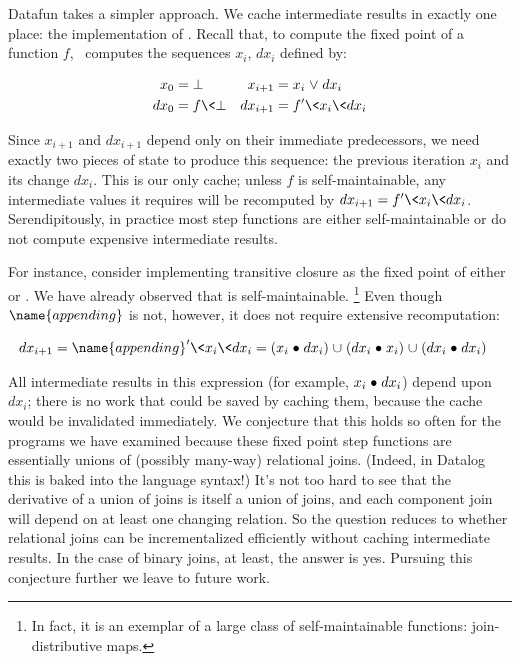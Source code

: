 Datafun takes a simpler approach.
%
We cache intermediate results in exactly one place: the implementation of \semifix.
%
Recall that, to compute the fixed point of a function $f$, \semifix\ computes the sequences $x_i$, $dx_i$ defined by:

\begin{align*}
  x_0 &= \bot &
  x_{i + 1} &= x_i \vee dx_i\\
  dx_0 &= f \<\bot &
  dx_{i + 1} &= f' \<x_i \<dx_i
\end{align*}

\noindent
Since $x_{i + 1}$ and $dx_{i + 1}$ depend only on their immediate predecessors, we
need exactly two pieces of state to produce this sequence: the previous iteration $x_i$ and its change $dx_i$.
%
This is our only cache; unless $f$ is self-maintainable, any intermediate values it requires will be recomputed by $dx_{i + 1} = f' \<x_i \<dx_i$.
%
Serendipitously, in practice most step functions  are either self-maintainable or do not compute expensive intermediate results.

For instance, consider implementing transitive closure as the fixed point of either  or .
%
We have already observed that  is self-maintainable.%
%
\footnote{In fact, it is an exemplar of a large class of self-maintainable functions: join-distributive maps. 
%
}
%
Even though $\name{appending}$ is not, however, it does not require extensive recomputation:

\begin{align*}
  dx_{i + 1} &= \name{appending}' \<x_i \<dx_i
  = (x_i \relcomp dx_i) \cup (dx_i \relcomp x_i) \cup (dx_i \relcomp dx_i)
\end{align*}

\noindent
All intermediate results in this expression (for example, $x_i \mathrel{\bullet} dx_i$) depend upon $dx_i$; there is no work that could be saved by caching them, because the cache would be invalidated immediately.
%
We conjecture that this holds so often for the programs we have examined because these fixed point step functions are essentially unions of (possibly many-way) relational joins.
%
(Indeed, in Datalog this is baked into the language syntax!)
%
It's not too hard to see that the derivative of a union of joins is itself a union of joins, and each component join will depend on at least one changing relation.
%
So the question reduces to whether relational joins can be incrementalized efficiently without caching intermediate results.
%
In the case of binary joins, at least, the answer is yes.
%
Pursuing this conjecture further we leave to future work.


